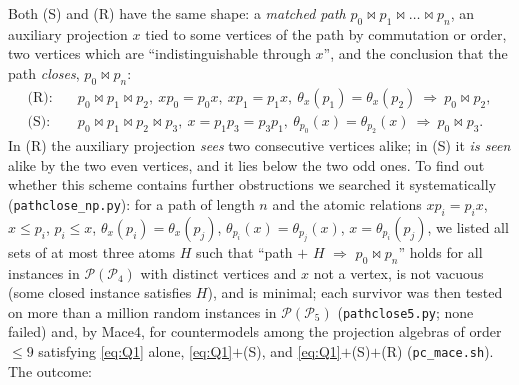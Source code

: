\documentclass[11pt]{amsart}
\theoremstyle{definition}
\renewcommand{\P}{\mathcal{P}}
\newcommand{\mt}{\bowtie}   %
\begin{document}
Both (S) and (R) have the same shape: a \emph{matched path} $p_0\mt p_1\mt\dots\mt p_n$, an auxiliary projection $x$ tied to some vertices of the path by commutation or order, two vertices which are ``indistinguishable through $x$'', and the conclusion that the path \emph{closes}, $p_0\mt p_n$:
\begin{align*}
\text{(R)}:\quad& p_0\mt p_1\mt p_2,\ xp_0=p_0x,\ xp_1=p_1x,\ \theta_x(p_1)=\theta_x(p_2)\ \Longrightarrow\ p_0\mt p_2,\\
\text{(S)}:\quad& p_0\mt p_1\mt p_2\mt p_3,\ x=p_1p_3=p_3p_1,\ \theta_{p_0}(x)=\theta_{p_2}(x)\ \Longrightarrow\ p_0\mt p_3 .
\end{align*}
In (R) the auxiliary projection \emph{sees} two consecutive vertices alike; in (S) it \emph{is seen} alike by the two even vertices, and it lies below the two odd ones. To find out whether this scheme contains further obstructions we searched it systematically (\texttt{pathclose\_np.py}): for a path of length $n$ and the atomic relations $xp_i=p_ix$, $x\le p_i$, $p_i\le x$, $\theta_x(p_i)=\theta_x(p_j)$, $\theta_{p_i}(x)=\theta_{p_j}(x)$, $x=\theta_{p_i}(p_j)$, we listed all sets of at most three atoms $H$ such that ``path $+$ $H$ $\Rightarrow$ $p_0\mt p_n$'' holds for all instances in $\P(\P_4)$ with distinct vertices and $x$ not a vertex, is not vacuous (some closed instance satisfies $H$), and is minimal; each survivor was then tested on more than a million random instances in $\P(\P_5)$ (\texttt{pathclose5.py}; none failed) and, by Mace4, for countermodels among the projection algebras of order $\le9$ satisfying \eqref{eq:Q1} alone, \eqref{eq:Q1}$+$(S), and \eqref{eq:Q1}$+$(S)$+$(R) (\texttt{pc\_mace.sh}). The outcome:
\end{document}
